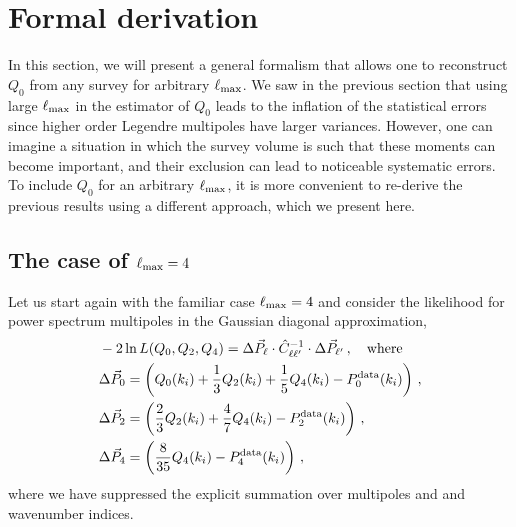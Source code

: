 \documentclass[12pt,a4paper]{article}
\newcommand{\be}{\begin{equation}}
\newcommand{\ee}{\end{equation}}
\renewcommand{\ln}{\mathop{\rm ln}\nolimits}
\newcommand{\lmax}{\ell_{\rm max}}
\begin{document}
\section{Formal derivation}
\label{sec:full}

In this section, we will present a general formalism that allows one to 
reconstruct $Q_0$ from any survey for arbitrary $\lmax$. 
We saw in the previous section that using large $\lmax$ in the estimator of $Q_0$ leads to the inflation
of the statistical errors since higher order Legendre multipoles have larger variances. 
However, one can imagine a situation in which the survey volume is such that these moments can become 
important, and their exclusion can lead to noticeable systematic errors. 
To include $Q_0$ for an arbitrary $\ell_{\rm max}$, 
it is more convenient to re-derive the previous results 
using a different approach, which we present here.

\subsection{The case of $\ell_{\rm max}=4$}

Let us start again with the familiar case $\lmax=4$ and consider the likelihood for power spectrum multipoles in the Gaussian diagonal approximation, 
\be
\label{eq:llkl4}
\begin{split}
& -2\ln L(Q_0,Q_2,Q_4) = \Delta \vec{P}_{\ell}
\cdot \hat{C}_{\ell \ell'}^{-1}\cdot \Delta \vec{P}_{\ell'} \,, \quad \text{where}\\
& \Delta \vec{P}_{0}=\left(Q_0(k_i) + \frac{1}{3}Q_2(k_i) + \frac{1}{5}Q_4(k_i)-P_{0}^{{\rm data}}(k_i)\right)\,,\\
& \Delta \vec{P}_{2}=\left(\frac{2}{3}Q_2(k_i) + \frac{4}{7}Q_4(k_i)
-P_{2}^{\rm data}(k_i)
\right)\,,\\
& \Delta \vec{P}_{4}=\left(\frac{8}{35}Q_4(k_i)-P_{4}^{\rm data}(k_i)\right)\,,\\
\end{split} 
\ee
where we have suppressed the explicit summation over multipoles and 
and wavenumber indices.
\end{document}

